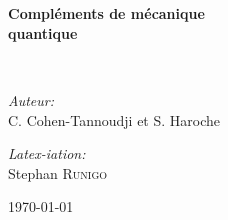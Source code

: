 \begin{titlepage}
%
~\\[1cm]

\begin{center}
\end{center}

\textsc{\Large }\\[0.5cm]

\HRule

\begin{center}
{\huge \bfseries Compléments de mécanique\\
quantique\\[0.4cm] }
\end{center}

\HRule \\[1.5cm]

\begin{center}
\end{center}

\begin{flushleft} \large
\emph{Auteur:}\\
C. Cohen-Tannoudji et S. Haroche
\end{flushleft}

\vfill
\begin{flushright} \large
\emph{Latex-iation:}\\
Stephan \textsc{Runigo}
\end{flushright}

\vfill
{\large \today}

\end{titlepage}
